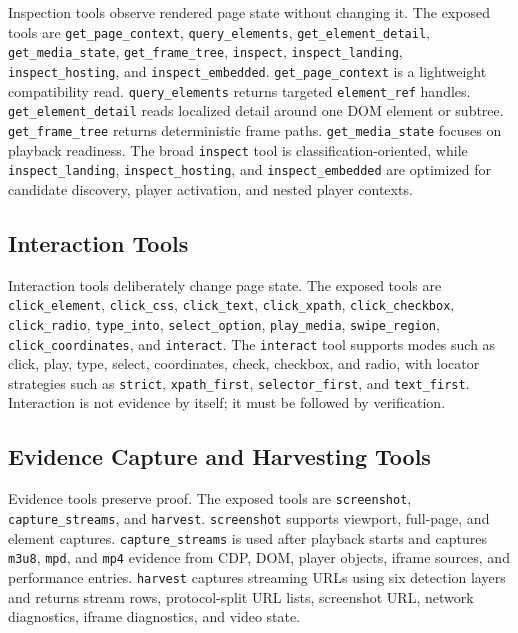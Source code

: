 Inspection tools observe rendered page state without changing it. The exposed
tools are \texttt{get\_page\_context}, \texttt{query\_elements},
\texttt{get\_element\_detail}, \texttt{get\_media\_state},
\texttt{get\_frame\_tree}, \texttt{inspect}, \texttt{inspect\_landing},
\texttt{inspect\_hosting}, and \texttt{inspect\_embedded}.
\texttt{get\_page\_context} is a lightweight compatibility read.
\texttt{query\_elements} returns targeted \texttt{element\_ref} handles.
\texttt{get\_element\_detail} reads localized detail around one DOM element or
subtree. \texttt{get\_frame\_tree} returns deterministic frame paths.
\texttt{get\_media\_state} focuses on playback readiness. The broad
\texttt{inspect} tool is classification-oriented, while
\texttt{inspect\_landing}, \texttt{inspect\_hosting}, and
\texttt{inspect\_embedded} are optimized for candidate discovery, player
activation, and nested player contexts.

\subsection{Interaction Tools}

Interaction tools deliberately change page state. The exposed tools are
\texttt{click\_element}, \texttt{click\_css}, \texttt{click\_text},
\texttt{click\_xpath}, \texttt{click\_checkbox}, \texttt{click\_radio},
\texttt{type\_into}, \texttt{select\_option}, \texttt{play\_media},
\texttt{swipe\_region}, \texttt{click\_coordinates}, and \texttt{interact}.
The \texttt{interact} tool supports modes such as click, play, type, select,
coordinates, check, checkbox, and radio, with locator strategies such as
\texttt{strict}, \texttt{xpath\_first}, \texttt{selector\_first}, and
\texttt{text\_first}. Interaction is not evidence by itself; it must be
followed by verification.

\subsection{Evidence Capture and Harvesting Tools}

Evidence tools preserve proof. The exposed tools are \texttt{screenshot},
\texttt{capture\_streams}, and \texttt{harvest}. \texttt{screenshot} supports
viewport, full-page, and element captures. \texttt{capture\_streams} is used
after playback starts and captures \texttt{m3u8}, \texttt{mpd}, and
\texttt{mp4} evidence from CDP, DOM, player objects, iframe sources, and
performance entries. \texttt{harvest} captures streaming URLs using six
detection layers and returns stream rows, protocol-split URL lists, screenshot
URL, network diagnostics, iframe diagnostics, and video state.

